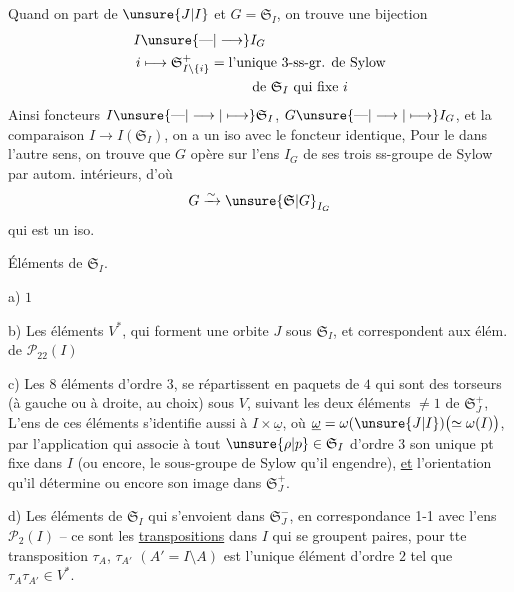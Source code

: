 Quand on part de $\unsure{J|I}$ et  $G=\mathfrak{S}_I$, on trouve une bijection
\[
\begin{aligned}
I&\unsure{\text{---}|\longrightarrow} I_G\\
i&\longmapsto\mathfrak{S}_{I\setminus\{i\}}^+=\text{l'unique 3-ss-gr. de Sylow}\\
&\hspace{8em}\text{de }\mathfrak{S}_I\text{ qui fixe }i
\end{aligned}
\]
Ainsi   foncteurs $I\unsure{\text{---}|\longrightarrow|\longmapsto}\mathfrak{S}_I$, $G\unsure{\text{---}|\longrightarrow|\longmapsto} I_G$, et la comparaison $I\longrightarrow I(\mathfrak{S}_I)$, on a un iso avec le  foncteur identique,
Pour le  dans l'autre sens, on trouve que $G$ opère sur l'ens $I_G$ de ses trois ss-groupe de Sylow par autom. intérieurs, d'où
\[
G\xrightarrow{\sim}\unsure{\mathfrak{S}|G}_{I_G}
\]
qui est un iso.

Éléments de $\mathfrak{S}_I$.

a) $1$

b) Les  éléments   $V^{*}$, qui forment une orbite $J$ sous $\mathfrak{S}_I$, et correspondent aux élém. de $\mathcal{P}_{22}(I)$

c) Les  $8$ éléments d'ordre $3$, se répartissent en    paquets de $4$ qui sont des torseurs (à gauche ou à droite, au choix) sous $V$, suivant les deux éléments $\ne1$ de $\mathfrak{S}_J^+$, L'ens de ces éléments s'identifie aussi à $I\times\underline{\omega}$, où $\underline{\omega}=\omega(\unsure{J|I})\bigl(\simeq\omega(I)\bigr)$, par l'application qui associe à tout $\unsure{\rho|p}\in\mathfrak{S}_I$ d'ordre $3$ son unique pt fixe dans $I$ (ou encore, le sous-groupe de Sylow qu'il engendre), \uline{et} l'orientation qu'il détermine  ou encore son image dans $\mathfrak{S}_J^+$.

d) Les   éléments   de $\mathfrak{S}_I$ qui s'envoient dans $\mathfrak{S}_J^-$, en correspondance 1-1 avec l'ens $\mathcal{P}_2(I)$ -- ce sont les \uline{transpositions} dans $I$ qui se groupent    paires, pour tte transposition $\tau_A$, $\tau_{A'}$ \deleted{$\unsure{\tau}$} $(A'=I\setminus A)$ est l'unique  élément d'ordre $2$ tel que $\tau_A\tau_{A'}\in V^*$.

